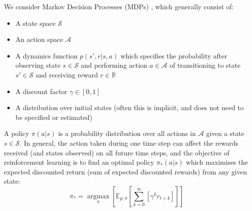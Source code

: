 We consider Markov Decision Processes (MDPs) \cite{sutton2018reinforcement}, which generally consist of:
\begin{itemize}
    \item A state space $\mathcal{S}$
    \item An action space $\mathcal{A}$
    \item A dynamics function $p(s', r \vert s, a)$ which specifies the probability after observing state $s\in\mathcal{S}$ and performing action $a\in\mathcal{A}$ of transitioning to state $s'\in\mathcal{S}$ and receiving reward $r\in\mathbb{R}$
    \item A discount factor $\gamma\in[0, 1]$
    \item A distribution over initial states (often this is implicit, and does not need to be specified or estimated)
\end{itemize}
A policy $\pi(a\vert s)$ is a probability distribution over all actions in $\mathcal{A}$ given a state $s\in\mathcal{S}$. In general, the action taken during one time step can affect the rewards received (and states observed) on all future time steps, and the objective of reinforcement learning is to find an optimal policy $\pi_*(a\vert s)$ which maximises the expected discounted return (sum of expected discounted rewards) from any given state:
\begin{equation}
    \pi_* = \underset{\pi}{\operatorname{argmax}}\left[ \mathbb{E}_{p, \pi} \left[ \sum_{k = 0}^\infty{\left[ \gamma^k r_{t+k} \right]} \right] \right]
\end{equation}
